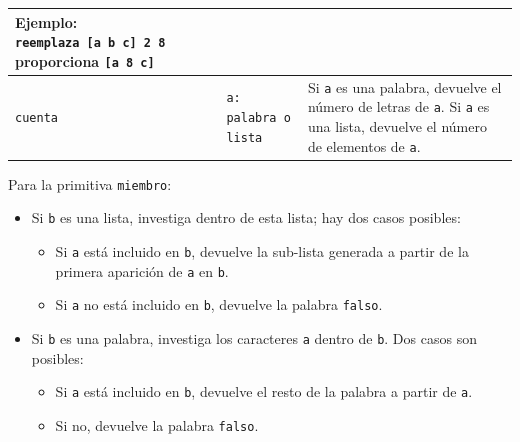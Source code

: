 \begin{center}
\begin{longtable}{|m{3cm}|m{4cm}|m{9cm}|}
        \textbf{Ejemplo}: \texttt{reemplaza~[a~b~c]~2~8} proporciona
        \texttt{[a~8~c]} \\ \hline 
   \texttt{cuenta} \index{cuenta@\texttt{cuenta}} & 
      \texttt{a: palabra o lista} &
        Si \texttt{a} es una palabra, devuelve el n\'umero de letras de
        \texttt{a}. Si \texttt{a} es una lista, devuelve el n\'umero de
        elementos de \texttt{a}.\\ \hline 
\end{longtable} \end{center}


Para la primitiva \texttt{miembro}:
\begin{itemize}
   \item Si \texttt{b} es una lista, investiga dentro de esta lista; hay dos
      casos posibles: 
      \begin{itemize}
         \item Si \texttt{a} est\'a incluido en \texttt{b}, devuelve la
            sub-lista generada a partir de la primera aparici\'on de 
            \texttt{a} en \texttt{b}. 
         \item Si \texttt{a} no est\'a incluido en \texttt{b}, devuelve la
            palabra \texttt{falso}. 
      \end{itemize}
   \item Si \texttt{b} es una palabra, investiga los caracteres \texttt{a}
      dentro de \texttt{b}. Dos casos son posibles: 
      \begin{itemize}
         \item Si \texttt{a} est\'a incluido en \texttt{b}, devuelve el
            resto de la palabra a partir de \texttt{a}.
         \item Si no, devuelve la palabra \texttt{falso}. 
      \end{itemize}
\end{itemize}

